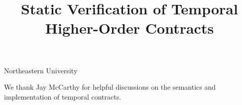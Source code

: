 \documentclass[preprint,onecolumn,9pt]{sigplanconf} %
\begin{document}
\copyrightdata{[to be supplied]}
\title{Static Verification of Temporal Higher-Order Contracts}

           {Northeastern University}
           {}


\maketitle
\begin{abstract}

\end{abstract}



\acks We thank Jay McCarthy for helpful discussions on the semantics
and implementation of temporal contracts.

\balance

%


% 
\end{document}
